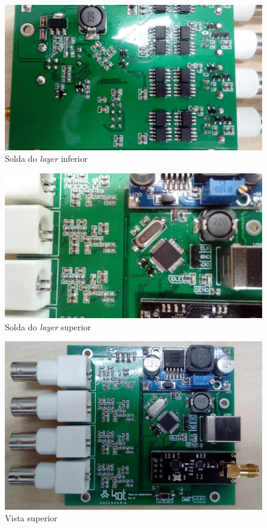 \documentclass[11pt]{abntex2}
\begin{document}
			\begin{figure}[!ht]
				\centering
				\includegraphics[width=\linewidth]{../Fotos/parteTras.jpg}
				\caption{Solda do \textit{layer} inferior}
			\end{figure}

			\begin{figure}[!ht]
				\centering
				\includegraphics[scale = 0.13]{../Fotos/parteCima.jpg}
				\caption{Solda do \textit{layer} superior}
			\end{figure}

			\begin{figure}[!ht]
				\centering
				\includegraphics[width=\linewidth]{../Fotos/vistaSuperior.jpg}
				\caption{Vista superior}
			\end{figure}
\end{document}
